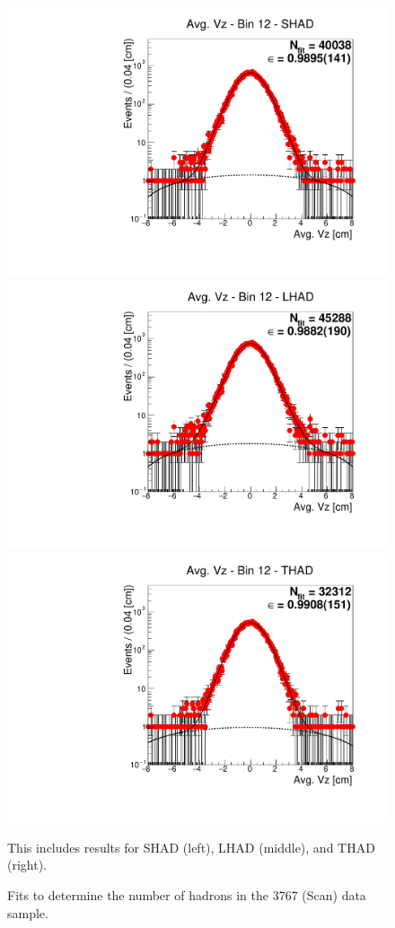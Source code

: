 \begin{figure}[H]
\centering
\includegraphics[scale=0.25]{figures/plots/nonDDbar_fit_results/scan/fit_scan_12_data_SHAD.pdf}
\hspace{-0.5cm}
\includegraphics[scale=0.25]{figures/plots/nonDDbar_fit_results/scan/fit_scan_12_data_LHAD.pdf}
\hspace{-0.5cm}
\includegraphics[scale=0.25]{figures/plots/nonDDbar_fit_results/scan/fit_scan_12_data_THAD.pdf}
\caption{Fits to determine the number of hadrons in the 3767 (Scan) data sample.}
{This includes results for SHAD (left), LHAD (middle), and THAD (right).}
\label{fig:hadron_fits_scan_12}
\end{figure}

